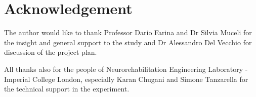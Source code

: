\documentclass[conference]{IEEEtran}
\begin{document}
\section*{Acknowledgement}
The author would like to thank Professor Dario Farina and Dr Silvia Muceli for the insight and general support to the study and Dr Alessandro Del Vecchio for discussion of the project plan.

All thanks also for the people of Neurorehabilitation Engineering Laboratory - Imperial College London, especially Karan Chugani and Simone Tanzarella for the technical support in the experiment.


\begin{thebibliography}{00}



\end{thebibliography}
\end{document}
